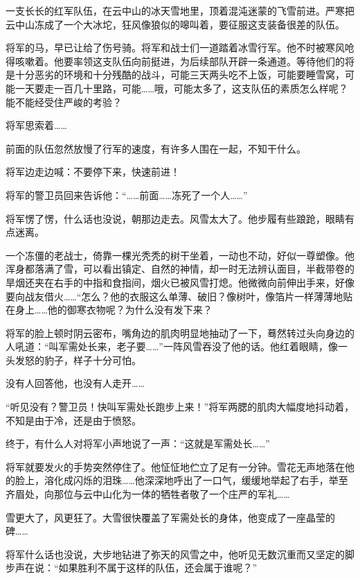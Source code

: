 \documentclass[12pt,UTF-8,openany]{ctexbook}
\begin{document}
\begin{large}
    
    一支长长的红军队伍，在云中山的冰天雪地里，顶着混沌迷蒙的飞雪前进。严寒把云中山冻成了一个大冰坨，狂风像狼似的嗥叫着，要征服这支装备很差的队伍。
    
    将军的马，早已让给了伤号骑。将军和战士们一道踏着冰雪行军。他不时被寒风呛得咳嗽着。他要率领这支队伍向前挺进，为后续部队开辟一条通道。等待他们的将是十分恶劣的环境和十分残酷的战斗，可能三天两头吃不上饭，可能要睡雪窝，可能一天要走一百几十里路，可能……哦，可能太多了，这支队伍的素质怎么样呢？能不能经受住严峻的考验？
    
    将军思索着……
    
    前面的队伍忽然放慢了行军的速度，有许多人围在一起，不知干什么。
    
    将军边走边喊：不要停下来，快速前进！
    
    将军的警卫员回来告诉他：“……前面……冻死了一个人……”
    
    将军愣了愣，什么话也没说，朝那边走去。风雪太大了。他步履有些踉跄，眼睛有点迷离。
    
    一个冻僵的老战士，倚靠一棵光秃秃的树干坐着，一动也不动，好似一尊塑像。他浑身都落满了雪，可以看出镇定、自然的神情，却一时无法辨认面目，半截带卷的旱烟还夹在右手的中指和食指间，烟火已被风雪打熄。他微微向前伸出手来，好像要向战友借火……“怎么？他的衣服这么单薄、破旧？像树叶，像箔片一样薄薄地贴在身上……他的御寒衣物呢？为什么没有发下来？
    
    将军的脸上顿时阴云密布，嘴角边的肌肉明显地抽动了一下，蓦然转过头向身边的人吼道：“叫军需处长来，老子要……”一阵风雪吞没了他的话。他红着眼睛，像一头发怒的豹子，样子十分可怕。
    
    没有人回答他，也没有人走开……
    
    “听见没有？警卫员！快叫军需处长跑步上来！”将军两腮的肌肉大幅度地抖动着，不知是由于冷，还是由于愤怒。
    
    终于，有什么人对将军小声地说了一声：“这就是军需处长……”
    
    将军就要发火的手势突然停住了。他怔怔地伫立了足有一分钟。雪花无声地落在他的脸上，溶化成闪烁的泪珠……他深深地呼出了一口气，缓缓地举起了右手，举至齐眉处，向那位与云中山化为一体的牺牲者敬了一个庄严的军礼……
    
    雪更大了，风更狂了。大雪很快覆盖了军需处长的身体，他变成了一座晶莹的碑……
    
    将军什么话也没说，大步地钻进了弥天的风雪之中，他听见无数沉重而又坚定的脚步声在说：“如果胜利不属于这样的队伍，还会属于谁呢？”
    
\end{large}
\end{document}
